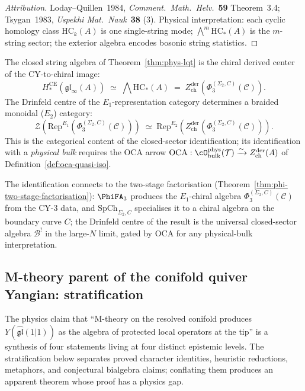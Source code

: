 \begin{proof}[Attribution]
Loday--Quillen~1984, \emph{Comment.\ Math.\ Helv.}~\textbf{59} Theorem~3.4; Tsygan~1983, \emph{Uspekhi Mat.\ Nauk}~\textbf{38} (3). Physical interpretation: each cyclic homology class $\mathrm{HC}_k(A)$ is one single-string mode; $\bigwedge^m \mathrm{HC}_*(A)$ is the $m$-string sector; the exterior algebra encodes bosonic string statistics.
\end{proof}

\begin{proposition}
\label{prop:phys-mth-derived-center}
The closed string algebra of Theorem~\ref{thm:phys-lqt} is the chiral derived center of the CY-to-chiral image:
\begin{equation}\label{eq:phys-closed-center}
H_*^{\mathrm{CE}}(\mathfrak{gl}_\infty(A)) \;\simeq\; \bigwedge \mathrm{HC}_*(A) \;=\; Z^{\mathrm{der}}_{\mathrm{ch}}(\Phi_3^{(\Sigma_2, C)}(\mathcal{C})).
\end{equation}
The Drinfeld centre of the $E_1$-representation category determines a braided monoidal ($E_2$) category:
\[
\mathcal{Z}(\mathrm{Rep}^{E_1}(\Phi_3^{(\Sigma_2, C)}(\mathcal{C}))) \;\simeq\; \mathrm{Rep}^{E_2}(Z^{\mathrm{der}}_{\mathrm{ch}}(\Phi_3^{(\Sigma_2, C)}(\mathcal{C}))).
\]
This is the categorical content of the closed-sector identification;
its identification with a \emph{physical bulk} requires the OCA arrow
$\mathrm{OCA}: \cO^{\mathrm{phys}}_{\mathrm{bulk}}(\mathcal T) \xrightarrow{\sim} Z^{\mathrm{der}}_{\mathrm{ch}}(A)$
of Definition~\ref{def:oca-quasi-iso}.
\end{proposition}

The identification connects to the two-stage factorisation (Theorem~\ref{thm:phi-two-stage-factorisation}): $\PhiFA_3$ produces the $E_1$-chiral algebra $\Phi_3^{(\Sigma_2, C)}(\mathcal{C})$ from the CY-3 data, and $\mathrm{SpCh}_{\Sigma_2,C}$ specialises it to a chiral algebra on the boundary curve $C$; the Drinfeld centre of the result is the universal closed-sector algebra $\mathcal{B}^!$ in the large-$N$ limit, gated by OCA for any physical-bulk interpretation.

\subsection{M-theory parent of the conifold quiver Yangian: stratification}
\label{subsec:m-theory-parent-stratification}

The physics claim that ``M-theory on the resolved conifold produces $Y(\widehat{\mathfrak{gl}}(1|1))$ as the algebra of protected local operators at the tip'' is a synthesis of four statements living at four distinct epistemic levels. The stratification below separates proved character identities, heuristic reductions, metaphors, and conjectural bialgebra claims; conflating them produces an apparent theorem whose proof has a physics gap.


